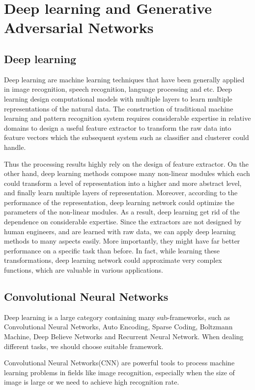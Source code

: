 \chapter{Deep learning and Generative Adversarial Networks}

\section{Deep learning}
Deep learning are machine learning techniques that have been generally applied in image recognition, speech recognition, language processing and etc. Deep learning design computational models with multiple layers to learn multiple representations of the natural data. The construction of traditional machine learning and pattern recognition system requires considerable expertise in relative domains to design a useful feature extractor to transform the raw data into feature vectors which the subsequent system such as classifier and clusterer could handle.

Thus the processing results highly rely on the design of feature extractor. On the other hand, deep learning methods compose many non-linear modules which each could transform a level of representation into a higher and more abstract level, and finally learn multiple layers of representation. Moreover, according to the performance of the representation, deep learning network could optimize the parameters of the non-linear modules. As a result, deep learning get rid of the dependence on considerable expertise. Since the extractors are not designed by human engineers, and are learned with raw data, we can apply deep learning methods to many aspects easily. More importantly, they might have far better performance on a specific task than before. In fact, while learning these transformations, deep learning network could approximate very complex functions, which are valuable in various applications.


\section{Convolutional Neural Networks}
Deep learning is a large category containing many sub-frameworks, such as Convolutional Neural Networks, Auto Encoding, Sparse Coding, Boltzmann Machine, Deep Believe Networks and Recurrent Neural Network. When dealing different tasks, we should choose suitable framework.

Convolutional Neural Networks(CNN) are powerful tools to process machine learning problems in fields like image recognition, especially when the size of image is large or we need to achieve high recognition rate.

